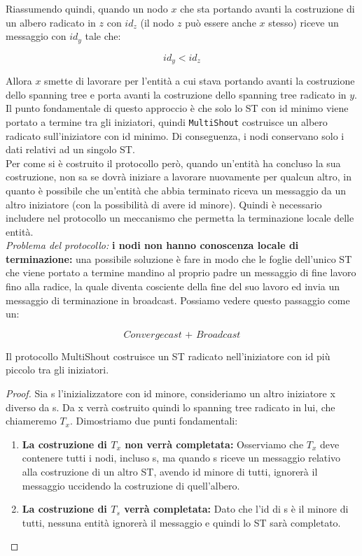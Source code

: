 Riassumendo quindi, quando un nodo $x$ che sta portando avanti la costruzione di
un albero radicato in $z$ con $id_z$ (il nodo $z$ può essere anche $x$ stesso)
riceve un messaggio con $id_y$ tale che:

$$
    id_y < id_z
$$

Allora $x$ smette di lavorare per l'entità a cui stava portando avanti la
costruzione dello spanning tree e porta avanti la costruzione dello spanning
tree radicato in $y$. Il punto fondamentale di questo approccio è che solo lo ST
con id minimo viene portato a termine tra gli iniziatori, quindi
\texttt{MultiShout} costruisce un albero radicato sull'iniziatore con id minimo.
Di conseguenza, i nodi conservano solo i dati relativi ad un singolo ST.\\
Per come si è costruito il protocollo però, quando un'entità ha concluso la sua
costruzione, non sa se dovrà iniziare a lavorare nuovamente per qualcun altro,
in quanto è possibile che un'entità che abbia terminato riceva un messaggio da
un altro iniziatore (con la possibilità di avere id minore). Quindi è necessario
includere nel protocollo un meccanismo che permetta la terminazione locale delle
entità. \\
\textit{Problema del protocollo:} \textbf{i nodi non hanno conoscenza locale di
    terminazione:} una possibile soluzione è fare in modo che le foglie dell'unico
ST che viene portato a termine mandino al proprio padre un messaggio di fine
lavoro fino alla radice, la quale diventa cosciente della fine del suo lavoro ed
invia un messaggio di terminazione in broadcast. Possiamo vedere questo
passaggio come un:

$$
    \textit{Convergecast + Broadcast}
$$

\begin{theorem}
    Il protocollo MultiShout costruisce un ST radicato nell'iniziatore con
    id più piccolo tra gli iniziatori.
\end{theorem}

\begin{proof}
    Sia s l'inizializzatore con id minore, consideriamo un altro iniziatore x
    diverso da s. Da x verrà costruito quindi lo spanning tree radicato in lui,
    che chiameremo $T_x$. Dimostriamo due punti fondamentali:
    \begin{enumerate}
        \item \textbf{La costruzione di $T_x$ non verrà completata:} Osserviamo che
              $T_x$ deve contenere tutti i nodi, incluso s, ma quando s riceve un
              messaggio relativo alla costruzione di un altro ST, avendo id minore di
              tutti, ignorerà il messaggio uccidendo la costruzione di quell'albero.
        \item \textbf{La costruzione di $T_s$ verrà completata:} Dato che l'id di s
              è il minore di tutti, nessuna entità ignorerà il messaggio e quindi lo ST
              sarà completato.
    \end{enumerate}
\end{proof}

